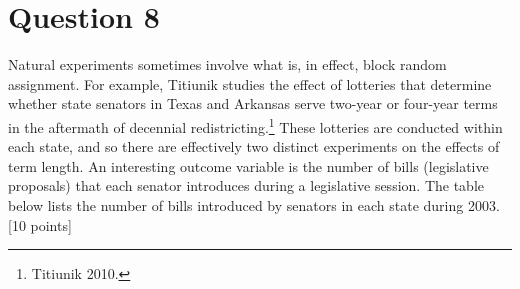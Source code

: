 \documentclass[11pt,notitlepage]{article}\usepackage[]{graphicx}\usepackage[]{color}
\begin{document}
\section*{Question 8}


Natural experiments sometimes involve what is, in effect, block random assignment. For example, Titiunik studies the effect of lotteries that determine whether state senators in Texas and Arkansas serve two-year or four-year terms in the aftermath of decennial redistricting.\footnote{Titiunik 2010.} These lotteries are conducted within each state, and so there are effectively two distinct experiments on the effects of term length. An interesting outcome variable is the number of bills (legislative proposals) that each senator introduces during a legislative session. The table below lists the number of bills introduced by senators in each state during 2003. [10 points]
\end{document}
